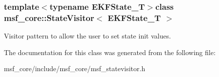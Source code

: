 \subsubsection*{template$<$typename E\-K\-F\-State\-\_\-\-T$>$class msf\-\_\-core\-::\-State\-Visitor$<$ E\-K\-F\-State\-\_\-\-T $>$}

Visitor pattern to allow the user to set state init values. 

The documentation for this class was generated from the following file\-:\begin{DoxyCompactItemize}
\item 
msf\-\_\-core/include/msf\-\_\-core/msf\-\_\-statevisitor.\-h\end{DoxyCompactItemize}
